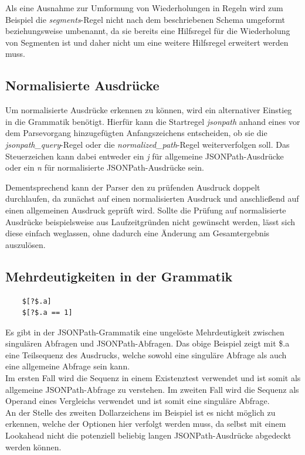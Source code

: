 \documentclass[oneside]{ausarbeitung}
\begin{document}
Als eine Ausnahme zur Umformung von Wiederholungen in Regeln wird zum Beispiel die \textit{segments}-Regel nicht nach dem beschriebenen Schema umgeformt beziehungsweise umbenannt, da sie bereits eine Hilfsregel für die Wiederholung von Segmenten ist und daher nicht um eine weitere Hilfsregel erweitert werden muss.




\subsection{Normalisierte Ausdrücke}

Um normalisierte Ausdrücke erkennen zu können, wird ein alternativer Einstieg in die Grammatik benötigt. Hierfür kann die Startregel \textit{jsonpath} anhand eines vor dem Parsevorgang hinzugefügten Anfangszeichens entscheiden, ob sie die \textit{jsonpath\_query}-Regel oder die \textit{normalized\_path}-Regel weiterverfolgen soll. Das Steuerzeichen kann dabei entweder ein \textit{j} für allgemeine JSONPath-Ausdrücke oder ein \textit{n} für normalisierte JSONPath-Ausdrücke sein.

Dementsprechend kann der Parser den zu prüfenden Ausdruck doppelt durchlaufen, da zunächst auf einen normalisierten Ausdruck und anschließend auf einen allgemeinen Ausdruck geprüft wird. Sollte die Prüfung auf normalisierte Ausdrücke beispielsweise aus Laufzeitgründen nicht gewünscht werden, lässt sich diese einfach weglassen, ohne dadurch eine Änderung am Gesamtergebnis auszulösen.


\pagebreak

\subsection{Mehrdeutigkeiten in der Grammatik}

\begin{lstlisting}
	$[?$.a]
	$[?$.a == 1]
\end{lstlisting}

Es gibt in der JSONPath-Grammatik eine ungelöste Mehrdeutigkeit zwischen singulären Abfragen und JSONPath-Abfragen. Das obige Beispiel zeigt mit \$.a eine Teilsequenz des Ausdrucks, welche sowohl eine singuläre Abfrage als auch eine allgemeine Abfrage sein kann. \\
Im ersten Fall wird die Sequenz in einem Existenztest verwendet und ist somit als allgemeine JSONPath-Abfrage zu verstehen. Im zweiten Fall wird die Sequenz als Operand eines Vergleichs verwendet und ist somit eine singuläre Abfrage. \\
An der Stelle des zweiten Dollarzeichens im Beispiel ist es nicht möglich zu erkennen, welche der Optionen hier verfolgt werden muss, da selbst mit einem Lookahead nicht die potenziell beliebig langen JSONPath-Ausdrücke abgedeckt werden können. 
\end{document}
